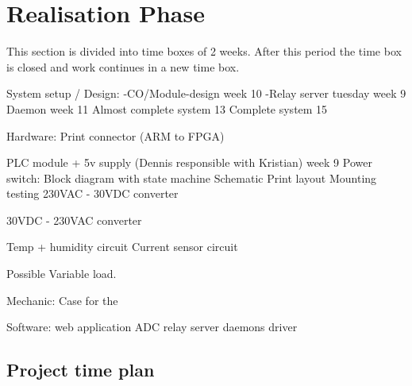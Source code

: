 \chapter{Realisation Phase}
This section is divided into time boxes of 2 weeks. After this period the time box is closed and work continues in a new time box. 

System setup / Design:
-CO/Module-design week 10
-Relay server tuesday week 9
Daemon week 11
Almost complete system 13
Complete system 15

Hardware:
Print connector (ARM to FPGA)

PLC module + 5v supply (Dennis responsible with Kristian) week 9
Power switch:
	Block diagram with state machine
	Schematic
	Print layout
	Mounting
	testing
230VAC - 30VDC converter

30VDC - 230VAC converter
	
Temp + humidity circuit
Current sensor circuit

Possible Variable load.

Mechanic:
Case for the 

Software:
web application
ADC
relay server
daemons
driver


\section{Project time plan}







